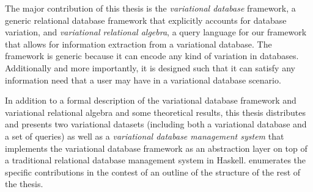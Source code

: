 The major contribution of this thesis is the \emph{variational database} framework,
a generic relational database framework that explicitly accounts for database variation,
and \emph{variational relational algebra}, a query language for our framework
that allows for information extraction from a variational database. 
The framework is generic because it can encode any kind of variation
in databases. Additionally and more importantly, it is designed such that it can satisfy
any information need that a user may have in a variational database scenario. 

In addition to a formal description of the variational database framework and
variational relational algebra and some theoretical results,
this thesis distributes and presents two variational datasets (including both a variational
database and a set of queries) as well as a \emph{variational database management system}
that implements the variational database framework as an abstraction layer on top of a 
traditional relational database management system in Haskell.
 enumerates the specific contributions in the contest of an outline
of the structure of the rest of the thesis. 





%


